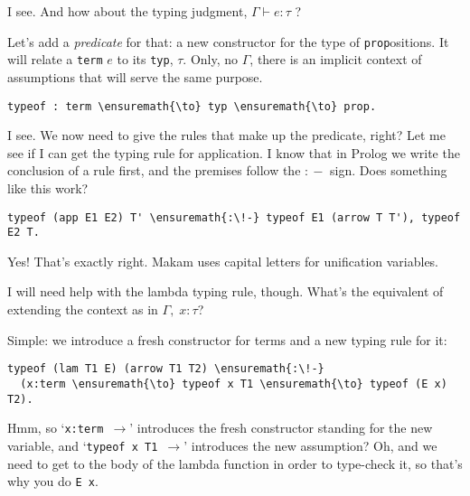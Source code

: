 \importantCodeblockEnd{}

\heroSTUDENT{} I see. And how about the typing judgment,
\(\Gamma \vdash e : \tau\) ?

\heroADVISOR{} Let's add a \emph{predicate} for that: a new constructor for
the type of \texttt{prop}ositions. It will relate a \texttt{term} \(e\)
to its \texttt{typ}, \(\tau\). Only, no \(\Gamma\), there is an implicit
context of assumptions that will serve the same purpose.

\importantCodeblock{}

\begin{verbatim}
typeof : term \ensuremath{\to} typ \ensuremath{\to} prop.
\end{verbatim}

\importantCodeblockEnd{}

\heroSTUDENT{} I see. We now need to give the rules that make up the
predicate, right? Let me see if I can get the typing rule for
application. I know that in Prolog we write the conclusion of a rule
first, and the premises follow the \texttt{\ensuremath{:\!-}} sign. Does something like
this work?

\importantCodeblock{}

\begin{verbatim}
typeof (app E1 E2) T' \ensuremath{:\!-} typeof E1 (arrow T T'), typeof E2 T.
\end{verbatim}

\importantCodeblockEnd{}

\heroADVISOR{} Yes! That's exactly right. Makam uses capital letters for
unification variables.

\heroSTUDENT{} I will need help with the lambda typing rule, though. What's
the equivalent of extending the context as in \(\Gamma, \; x : \tau\)?

\heroADVISOR{} Simple: we introduce a fresh constructor for terms and a new
typing rule for it:

\importantCodeblock{}

\begin{verbatim}
typeof (lam T1 E) (arrow T1 T2) \ensuremath{:\!-}
  (x:term \ensuremath{\to} typeof x T1 \ensuremath{\to} typeof (E x) T2).
\end{verbatim}

\importantCodeblockEnd{}

\heroSTUDENT{} Hmm, so `\texttt{x:term\ \ensuremath{\to}}' introduces the fresh
constructor standing for the new variable, and
`\texttt{typeof\ x\ T1\ \ensuremath{\to}}' introduces the new assumption?
Oh, and we need to get to the body of the lambda function in order to
type-check it, so that's why you do \texttt{E\ x}.

